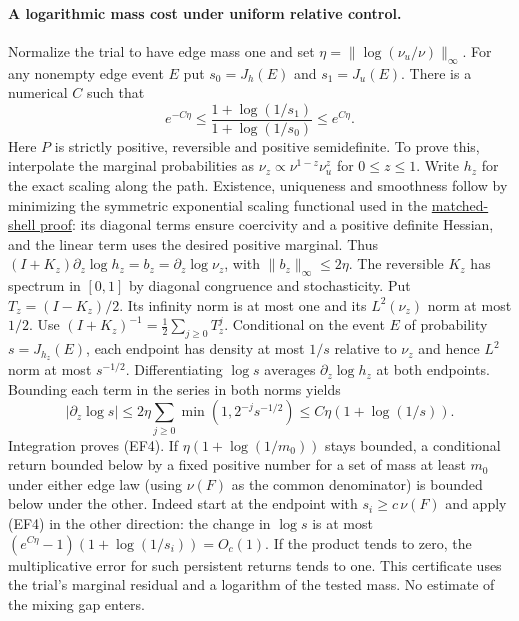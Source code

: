 \paragraph{A logarithmic mass cost under uniform relative control.}
Normalize the trial to have edge mass one and set
$\eta=\|\log(\nu_u/\nu)\|_\infty$. For any nonempty edge event $E$ put
$s_0=J_h(E)$ and $s_1=J_u(E)$. There is a numerical $C$ such that
\[
 e^{-C\eta}\le
 \frac{1+\log(1/s_1)}{1+\log(1/s_0)}
 \le e^{C\eta}.                                                \tag{EF4}
\]
Here $P$ is strictly positive, reversible and positive semidefinite.
To prove this, interpolate the marginal probabilities as
$\nu_z\propto\nu^{1-z}\nu_u^z$ for $0\le z\le1$.
Write $h_z$ for the exact scaling along the path. Existence, uniqueness
and smoothness follow by minimizing the symmetric exponential scaling
functional used in the \href{https://airr.science/papers/ARR-2026-2B2W1WQ7DF9N5VW7/}{matched-shell proof}:
its diagonal terms ensure coercivity and a positive definite Hessian,
and the linear term uses the desired positive marginal. Thus
$(I+K_z)\partial_z\log h_z=b_z=\partial_z\log\nu_z$,
with $\|b_z\|_\infty\le2\eta$. The reversible $K_z$ has spectrum in
$[0,1]$ by diagonal congruence and stochasticity. Put $T_z=(I-K_z)/2$.
Its infinity norm is at most one and its $L^2(\nu_z)$ norm at most $1/2$.
Use $(I+K_z)^{-1}=\frac12\sum_{j\ge0}T_z^j$. Conditional on the event
$E$ of probability $s=J_{h_z}(E)$, each endpoint has density at most
$1/s$ relative to $\nu_z$ and hence $L^2$ norm at most $s^{-1/2}$.
Differentiating $\log s$ averages $\partial_z\log h_z$ at both endpoints.
Bounding each term in the series in both norms yields
\[
 |\partial_z\log s|\le 2\eta\sum_{j\ge0}\min(1,2^{-j}s^{-1/2})
                  \le C\eta(1+\log(1/s)).
\]
Integration proves (EF4). If $\eta(1+\log(1/m_0))$ stays bounded, a
conditional return bounded below by a fixed positive number for a set
of mass at least $m_0$ under either edge law (using $\nu(F)$ as the
common denominator) is bounded below under the other. Indeed start at
the endpoint with $s_i\ge c\,\nu(F)$ and apply (EF4) in the other
direction: the change in $\log s$ is at most
$(e^{C\eta}-1)(1+\log(1/s_i))=O_c(1)$. If the product tends to zero,
the multiplicative error for such persistent returns tends to one.
This certificate uses the trial's marginal residual and a logarithm
of the tested mass. No estimate of the mixing gap enters.

